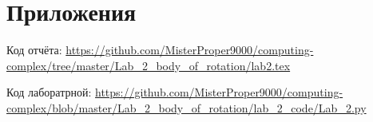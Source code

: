 \documentclass[a4]{article}
\begin{document}
\section{Приложения}

Код отчёта:\; \url{https://github.com/MisterProper9000/computing-complex/tree/master/Lab_2_body_of_rotation/lab2.tex}

Код лаборатрной:\; \url{https://github.com/MisterProper9000/computing-complex/blob/master/Lab_2_body_of_rotation/lab_2_code/Lab_2.py}


\end{document}
